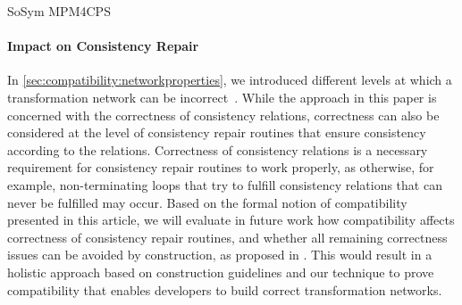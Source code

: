 \begin{copiedFrom}{SoSym MPM4CPS}
\paragraph{Impact on Consistency Repair}
In \autoref{sec:compatibility:networkproperties}, we introduced different levels at which a transformation network can be incorrect~\cite{klare2019icmt}.
While the approach in this paper is concerned with the correctness of consistency relations, %
correctness can also be considered at the level of consistency repair routines that ensure consistency according to the relations.
Correctness of consistency relations is a necessary requirement for consistency repair routines to work properly, as otherwise, for example, non-terminating loops that try to fulfill consistency relations that can never be fulfilled may occur.
Based on the formal notion of compatibility presented in this article, we will evaluate in future work how compatibility affects correctness of consistency repair routines, and whether all remaining correctness issues can be avoided by construction, as proposed in \cite{klare2019icmt}.
This would result in a holistic approach based on construction guidelines and our technique to prove compatibility that enables developers to build correct transformation networks.



\end{copiedFrom}
